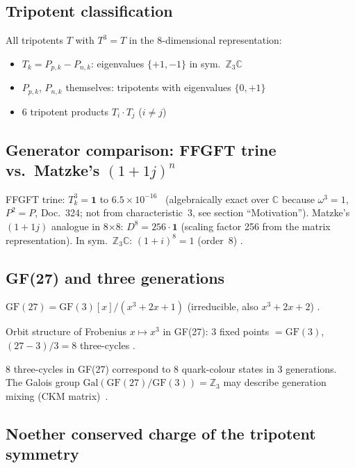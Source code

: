 \subsection{Tripotent classification}

All tripotents $T$ with $T^3 = T$ in the 8-dimensional representation:
\begin{itemize}
  \item $T_k = P_{p,k} - P_{n,k}$: eigenvalues $\{+1,-1\}$ in sym.\
    $\mathbb{Z}_3\mathbb{C}$ \BM
  \item $P_{p,k}$, $P_{n,k}$ themselves: tripotents with eigenvalues $\{0,+1\}$ \BM
  \item 6 tripotent products $T_i \cdot T_j$ ($i\neq j$) \BM
\end{itemize}

\subsection{Generator comparison: FFGFT trine vs.\ Matzke's $(1+1j)^n$}

FFGFT trine: $T_k^3 = \mathbf{1}$ to $6.5\times10^{-16}$ \BM\ (algebraically
exact over $\mathbb{C}$ because $\omega^3 = 1$, $P^2 = P$, Doc.~324; not from
characteristic~3, see section ``Motivation'').
Matzke's $(1+1j)$ analogue in 8$\times$8: $D^8 = 256\cdot\mathbf{1}$
(scaling factor 256 from the matrix representation).
In sym.\ $\mathbb{Z}_3\mathbb{C}$: $(1+i)^8 = 1$ (order~8) \BM.

\subsection{GF(27) and three generations}

$\mathrm{GF}(27) = \mathrm{GF}(3)[x]/(x^3+2x+1)$ (irreducible, also
$x^3+2x+2$) \BM.

Orbit structure of Frobenius $x\mapsto x^3$ in GF(27):
3 fixed points $= \mathrm{GF}(3)$,
$(27-3)/3 = 8$ three-cycles \BM.

\begin{keyresult}[Status~\KM]
8 three-cycles in GF(27) correspond to 8 quark-colour states
in 3 generations. The Galois group $\mathrm{Gal}(\mathrm{GF}(27)/\mathrm{GF}(3)) = \mathbb{Z}_3$
may describe generation mixing (CKM matrix)~\SM.
\end{keyresult}

\subsection{Noether conserved charge of the tripotent symmetry}

